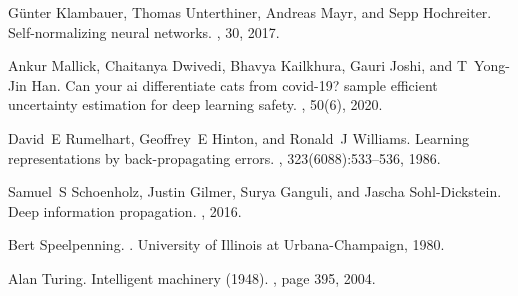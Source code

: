 \documentclass[11pt]{article}
\begin{document}
\begin{thebibliography}{10}
G{\"u}nter Klambauer, Thomas Unterthiner, Andreas Mayr, and Sepp Hochreiter.
\newblock Self-normalizing neural networks.
, 30, 2017.

Ankur Mallick, Chaitanya Dwivedi, Bhavya Kailkhura, Gauri Joshi, and T~Yong-Jin
  Han.
\newblock Can your ai differentiate cats from covid-19? sample efficient
  uncertainty estimation for deep learning safety.
, 50(6), 2020.

David~E Rumelhart, Geoffrey~E Hinton, and Ronald~J Williams.
\newblock Learning representations by back-propagating errors.
, 323(6088):533--536, 1986.

Samuel~S Schoenholz, Justin Gilmer, Surya Ganguli, and Jascha Sohl-Dickstein.
\newblock Deep information propagation.
, 2016.

Bert Speelpenning.
.
\newblock University of Illinois at Urbana-Champaign, 1980.

Alan Turing.
\newblock Intelligent machinery (1948).
, page 395, 2004.

\end{thebibliography}
\end{document}

